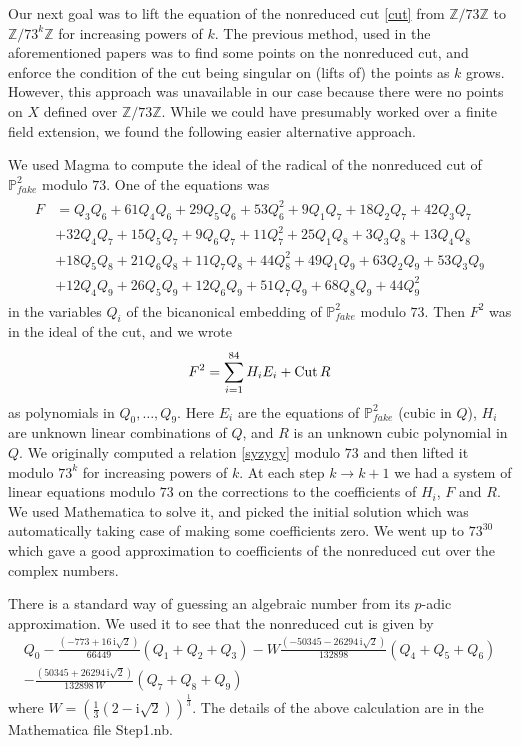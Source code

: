 \documentclass[11pt,reqno]{amsart}
\def\ii {{\mathrm i}}
\def\Z {{\mathbb Z}}
\def\P {{\mathbb P}}
\def\FPP {{\P^2_{fake}}}
\theoremstyle{definition}
\numberwithin{equation}{section}
\begin{document}
\medskip
Our next goal was to lift the equation of the nonreduced cut \eqref{cut} from $\Z/73\Z$ to $\Z/73^k\Z$ for increasing powers of $k$. The previous method, used in the aforementioned papers was to find some points on the nonreduced cut, and enforce the condition of the cut being singular on (lifts of) the points as $k$ grows. However, this approach was unavailable in our case because there were no points on $X$ defined over $\Z/73\Z$. While we could have presumably worked  over a finite field extension, we found the following easier alternative approach.

\medskip
We used Magma to compute the ideal of the radical of the nonreduced cut of $\FPP$ modulo $73$. One of the equations was 
\begin{align*}
\begin{array}{rl}
F &= Q_3 Q_6 + 61 Q_4 Q_6 + 29 Q_5 Q_6 + 53 Q_6^2 + 9 Q_1 Q_7 + 18 Q_2 Q_7 + 
   42 Q_3 Q_7 \\
 &  + 32 Q_4 Q_7 + 15 Q_5 Q_7 + 9 Q_6 Q_7 + 11 Q_7^2 + 25 Q_1 Q_8 + 
   3 Q_3 Q_8 + 13 Q_4 Q_8 
   \\
   &+ 18 Q_5 Q_8 + 21 Q_6 Q_8 + 11 Q_7 Q_8 + 44 Q_8^2 + 
   49 Q_1 Q_9 + 63 Q_2 Q_9 + 53 Q_3 Q_9
   \\& + 12 Q_4 Q_9 + 26 Q_5 Q_9 + 12 Q_6 Q_9 + 
   51 Q_7 Q_9 + 68 Q_8 Q_9 + 44 Q_9^2
   \end{array}
\end{align*}
in the variables $Q_i$ of the bicanonical embedding of $\FPP$ modulo $73$. Then $F^2$ was in the ideal of the cut, and we wrote 
\begin{equation}\label{syzygy}
F^2 = \sum_{i=1}^{84} H_i E_i + {\rm Cut}\,R
\end{equation}
as polynomials in $Q_0,\ldots,Q_9$. Here $E_i$ are the equations of $\FPP$ (cubic in $Q$), $H_i$ are unknown linear combinations of $Q$, and $R$ is an unknown cubic polynomial in $Q$.
We originally computed a relation \eqref{syzygy} modulo $73$ and then lifted it modulo $73^k$ for increasing powers of $k$. At each step $k\to k+1$ we had a system of linear equations modulo $73$ on the corrections to the coefficients of $H_i$, $F$ and $R$. We used Mathematica to solve it, and picked the initial solution which was automatically taking case of making some coefficients zero. We went up to $73^{30}$ which gave a good approximation to coefficients of the nonreduced cut over the complex numbers.

\medskip
There is a standard way of guessing an algebraic number from its $p$-adic approximation. We used it to see that the nonreduced cut is given by
\begin{equation}\label{cutexact}
\begin{array}{l}
Q_0 - \frac{(-773 + 16\, \ii \sqrt 2)}{66449} (Q_1 + Q_2 + Q_3) - 
  W \frac{ (-50345 - 26294\, \ii \sqrt 2)}{132898 } (Q_4 + Q_5 + Q_6) 
  \\
  - 
\frac {(50345 + 26294\,\ii \sqrt 2 )}{132898 \,W} (Q_7 + Q_8 + Q_9)
  \end{array}
\end{equation}
where $W = (\frac 13 (2 - \ii \sqrt 2 ))^{\frac 13}$. The details of the above calculation are in the Mathematica file Step1.nb.
\end{document}
